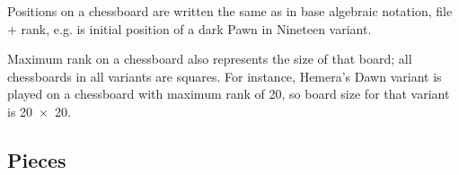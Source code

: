 Positions on a chessboard are written the same as in base algebraic notation, file + rank,
e.g.  is initial position of a dark Pawn in Nineteen variant.

Maximum rank on a chessboard also represents the size of that board; all chessboards in all
variants are squares. For instance, Hemera's Dawn variant is played on a chessboard with
maximum rank of 20, so board size for that variant is \mbox{20~$\times$~20}.

\clearpage %

\subsection*{Pieces}
\label{sec:Appendix/Introduction/Pieces}

